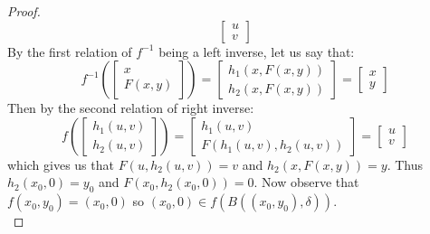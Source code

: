 \documentclass[10pt,letterpaper]{article} %
\begin{document}
\begin{proof}
\begin{equation*}
\begin{bmatrix}
u\\v
\end{bmatrix}
\end{equation*}
By the first relation of $f^{-1}$ being a left inverse, let us say that:
\begin{equation*}
f^{-1}\left(\begin{bmatrix}
x\\F(x, y)
\end{bmatrix}\right) = \begin{bmatrix}
h_1(x, F(x, y))\\h_2(x, F(x, y))
\end{bmatrix} = \begin{bmatrix}
x\\y
\end{bmatrix}
\end{equation*}
Then by the second relation of right inverse:
\begin{equation*}
f\left(\begin{bmatrix}
h_1(u, v)\\h_2(u, v)
\end{bmatrix}\right) = \begin{bmatrix}
h_1(u, v)\\F(h_1(u, v), h_2(u, v))
\end{bmatrix} = \begin{bmatrix}
u\\v
\end{bmatrix}
\end{equation*}
which gives us that $F(u, h_2(u, v)) = v$ and $h_2(x, F(x, y)) = y$. Thus $h_2(x_0, 0) = y_0$ and $F(x_0, h_2(x_0, 0)) = 0$. Now observe that $f(x_0, y_0) = (x_0, 0)$ so $(x_0, 0) \in f(B((x_0, y_0), \delta))$.\\


\end{proof}
\end{document}
